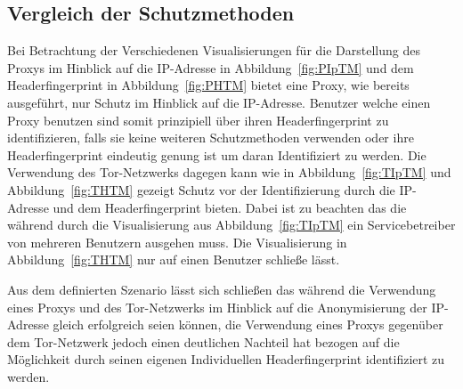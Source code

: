 \documentclass[
    fontsize=12pt,
    headings=small,
    parskip=half,           %
    bibliography=totoc,
    numbers=noenddot,       %
    open=any,               %
    ]{scrreprt}
\begin{document}
    \subsection{Vergleich der Schutzmethoden}
Bei Betrachtung der Verschiedenen Visualisierungen für die Darstellung des Proxys im Hinblick auf die IP-Adresse in Abbildung~\ref{fig:PIpTM} und dem Headerfingerprint in Abbildung~\ref{fig:PHTM} bietet eine Proxy, wie bereits ausgeführt, nur Schutz im Hinblick auf die IP-Adresse.
Benutzer welche einen Proxy benutzen sind somit prinzipiell über ihren Headerfingerprint zu identifizieren, falls sie keine weiteren Schutzmethoden verwenden oder ihre Headerfingerprint eindeutig genung ist um daran Identifiziert zu werden. 
Die Verwendung des Tor-Netzwerks dagegen kann wie in Abbildung~\ref{fig:TIpTM} und Abbildung~\ref{fig:THTM} gezeigt Schutz vor der Identifizierung durch die IP-Adresse und dem Headerfingerprint bieten.
Dabei ist zu beachten das die während durch die Visualisierung aus Abbildung~\ref{fig:TIpTM} ein Servicebetreiber von mehreren Benutzern ausgehen muss.
Die Visualisierung in Abbildung~\ref{fig:THTM} nur auf einen Benutzer schließe lässt.

Aus dem definierten Szenario lässt sich schließen das während die Verwendung eines Proxys und des Tor-Netzwerks im Hinblick auf die Anonymisierung der IP-Adresse gleich erfolgreich seien können, die Verwendung eines Proxys gegenüber dem Tor-Netzwerk jedoch einen deutlichen Nachteil hat bezogen auf die Möglichkeit durch seinen eigenen Individuellen Headerfingerprint identifiziert zu werden.

\end{document}
